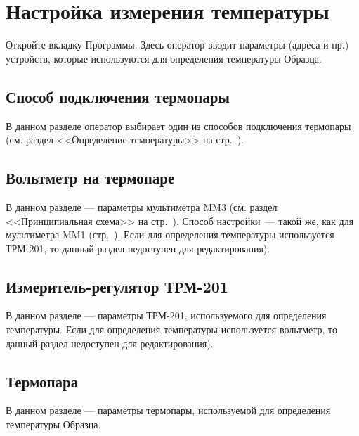 \documentclass[12pt, a4paper, twocolumn]{report}
\begin{document}



\section{Настройка измерения температуры}

Откройте вкладку  Программы. Здесь оператор вводит параметры (адреса и пр.) устройств, которые используются для определения температуры Образца.

\subsection{Способ подключения термопары}

В данном разделе оператор выбирает один из способов подключения термопары (см. раздел <<Определение температуры>> на стр.~\pageref{sec_t_measures}).

\subsection{Вольтметр на термопаре}

В данном разделе --- параметры мультиметра MM3 (см. раздел <<Принципиальная схема>> на стр.~\pageref{sec_schematic_diagram}). Способ настройки~--- такой же, как для мультиметра MM1 (стр.~\pageref{sec_mm1_config}). Если для определения температуры используется ТРМ-201, то данный раздел недоступен для редактирования).

\subsection{Измеритель-регулятор ТРМ-201}

В данном разделе --- параметры ТРМ-201, используемого для определения температуры. Если для определения температуры используется вольтметр, то данный раздел недоступен для редактирования).



\subsection{Термопара}

В данном разделе --- параметры термопары, используемой для определения температуры Образца.
\end{document}
